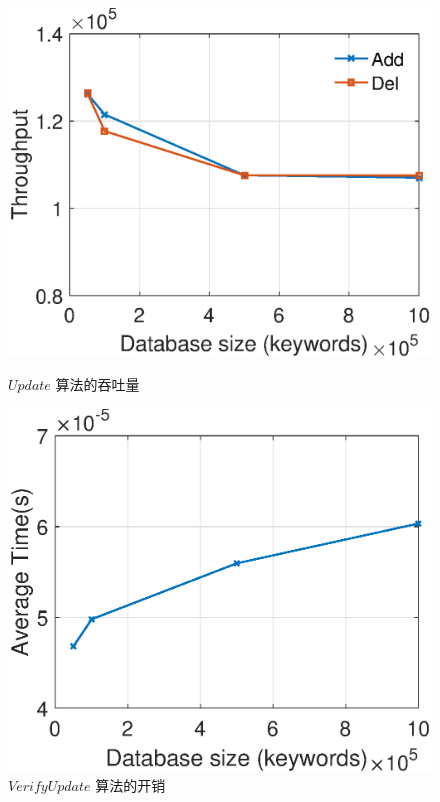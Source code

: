 \begin{figure}[bhpt]
  \begin{minipage}[b]{0.48 \textwidth}
    \includegraphics[width=\textwidth]{expr/update}
    \caption{$Update$ 算法的吞吐量}
    \label{fig:update}
  \end{minipage}
  \begin{minipage}[b]{0.48 \textwidth}
    \includegraphics[width=\textwidth]{expr/verifyupdate}
    \caption{$VerifyUpdate$ 算法的开销}
    \label{fig:verifyupdate}
  \end{minipage}

\centering
\end{figure}


